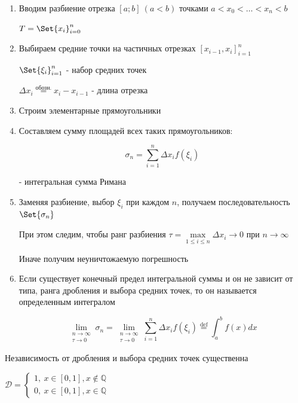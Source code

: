 \documentclass[12pt]{article}
\begin{document}
    \begin{enumerate}
        \item Вводим разбиение отрезка $[a; b]\ (a < b)$ точками $a < x_0 < \dots < x_n < b$

        $T = \Set{x_i}^n_{i=0}$

        \item Выбираем средние точки на частичных отрезках $[x_{i-1}, x_i]^n_{i=1}$

        $\Set{\xi_i}_{i=1}^n$ - набор средних точек

        $\Delta x_i \stackrel{\text{обозн.}}{=} x_i - x_{i-1}$ - длина отрезка

        \item Строим элементарные прямоугольники
        \item Составляем сумму площадей всех таких прямоугольников:

        \[\sigma_n = \sum^n_{i=1} \Delta x_i f(\xi_i)\]

        - интегральная сумма Римана

        \item Заменяя разбиение, выбор $\xi_i$ при каждом $n$, получаем последовательность $\Set{\sigma_n}$

        При этом следим, чтобы ранг разбиения $\tau = \max\limits_{1 \leq i \leq n} \Delta x_i \rightarrow 0$ при $n \to \infty$

        Иначе получим неуничтожаемую погрешность

        \item \Def \hypertarget{integraldefinition}{Если существует конечный предел интегральной суммы} и он не зависит от типа,
        ранга дробления и выбора средних точек, то он называется определенным интегралом

        \[\lim_{\substack{n\to\infty \\ \tau\to0}} \sigma_n = \lim_{\substack{n\to\infty \\ \tau\to0}} \sum^n_{i=1} \Delta x_i f(\xi_i) \stackrel{\text{def}}{=} \int_a^b f(x)dx\]

    \end{enumerate}

    \Nota Независимость от дробления и выбора средних точек существенна

    \Ex $\mathcal{D} = \begin{cases}
                           1,\ x \in [0, 1], x \not\in \mathbb{Q} \\ 0,\ x \in [0, 1], x \in \mathbb{Q}
    \end{cases}$
\end{document}
